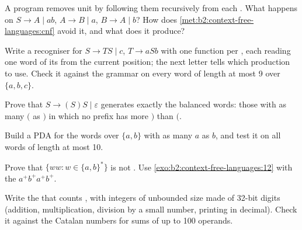 \begin{exercise}[$\star\star$]\label{exo:b2:context-free-languages:6}
A program removes unit  by following them recursively from each . What happens on $S \to A \mid
ab$, $A \to B \mid a$, $B \to A \mid b$? How does \cref{met:b2:context-free-languages:cnf} avoid it, and what does it
produce?
\end{exercise}

\begin{exercise}[$\star\star$]\label{exo:b2:context-free-languages:7}
Write a recogniser for $S \to TS \mid c$, $T \to aSb$ with one function per , each reading one word of its
 from the current position; the next letter tells which production to use. Check it against the grammar on
every word of length at most 9 over $\{a, b, c\}$.
\end{exercise}

\begin{exercise}[$\star\star$]\label{exo:b2:context-free-languages:8}
Prove that $S \to (S)S \mid \varepsilon$ generates exactly the balanced words: those with as many $($ as $)$ in which
no prefix has more $)$ than $($.
\end{exercise}

\begin{exercise}[$\star\star$]\label{exo:b2:context-free-languages:9}
Build a PDA for the words over $\{a, b\}$ with as many $a$ as $b$, and test it on all words of length at most 10.
\end{exercise}

\begin{exercise}[$\star\star\star$]\label{exo:b2:context-free-languages:10}
Prove that $\{ww : w \in \{a, b\}^*\}$ is not . Use \cref{exo:b2:context-free-languages:12} with the
 $a^+b^+a^+b^+$.
\end{exercise}

\begin{exercise}[$\star\star\star$]\label{exo:b2:context-free-languages:11}
Write the  that counts , with integers of unbounded size made of 32-bit digits (addition,
multiplication, division by a small number, printing in decimal). Check it against the Catalan numbers for sums of up
to 100 operands.
\end{exercise}

